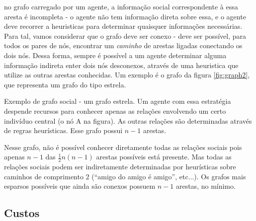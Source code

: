   no grafo carregado por um agente, a informação social correspondente à essa aresta é incompleta - o agente não tem informação direta sobre essa, e o agente deve recorrer a heuristicas para determinar quaisquer informações necessárias. Para tal, vamos considerar que o grafo deve ser conexo - deve ser possível, para todos os pares de nós, encontrar um \emph{caminho} de arestas ligadas conectando os dois nós. Dessa forma, sempre é possível a um agente determinar alguma informação indireta enter dois nós desconexos, através de uma heuristica que utilize as outras arestas conhecidas. Um exemplo é o grafo da figura \ref{fig:graph2}, que representa um grafo do tipo estrela. 
  \begin{marginfigure}[-10em]
\caption[Grafo estrela]{Exemplo de grafo social - um grafo estrela. Um agente com essa estratégia despende recursos para conhecer apenas as relações envolvendo um certo indivíduo central (o nó A na figura). As outras relações são determinadas através de regras heurísticas. Esse grafo possui $n-1$ arestas.}
\label{fig:graph2}
\end{marginfigure}
Nesse grafo, não é possível conhecer diretamente todas as relações sociais pois apenas $n-1$ das $\frac{1}{2}n(n-1)$ arestas possíveis está presente. Mas todas as relações sociais podem ser indiretamente determinadas por heurísticas sobre caminhos de comprimento 2 (``amigo do amigo é amigo'', etc...). Os grafos mais esparsos possíveis que ainda são conexos possuem $n-1$ arestas, no mínimo.

\subsection{Custos}

